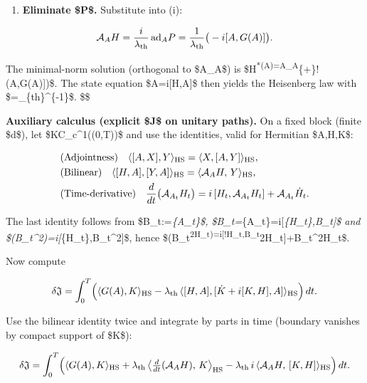 \documentclass[
]{article}
\providecommand{\tightlist}{%
  \setlength{\itemsep}{0pt}\setlength{\parskip}{0pt}}
\numberwithin{equation}{section}
\begin{document}
\begin{enumerate}
\def\labelenumi{(\roman{enumi})}
\setcounter{enumi}{2}
\tightlist
\item
  \textbf{Eliminate \$P\$.} Substitute into (i):
\end{enumerate}

\[
\mathcal A_A H=\frac{i}{\lambda_{\rm th}}\,\mathrm{ad}_A P
=\frac{1}{\lambda_{\rm th}}\big(-i[A,G(A)]\big).
\]

The minimal-norm solution (orthogonal to \$\ker\mathcal A\_A\$) is
\$H\textsuperscript{*(A)=\mathcal A\_A}\{+\}!\big(\tfrac{-,i}{\lambda\_{\rm th}}{[}A,G(A){]}\big)\$.
The state equation \$\dot A=i{[}H,A{]}\$ then yields the Heisenberg law
with \$\hbar=\lambda\_\{\rm th\}\^{}\{-1\}\$. \$\square\$

\textbf{Auxiliary calculus (explicit \$\delta\mathfrak J\$ on unitary
paths).} On a fixed block (finite \$d\$), let \$K\in C\_c\^{}1((0,T))\$
and use the identities, valid for Hermitian \$A,H,K\$:

\[
\begin{aligned}
&\text{(Adjointness)}\quad \langle[A,X],Y\rangle_{\rm HS}=\langle X,[A,Y]\rangle_{\rm HS},\\
&\text{(Bilinear)}\quad \langle[H,A],[Y,A]\rangle_{\rm HS}=\langle \mathcal A_A H,\,Y\rangle_{\rm HS},\\
&\text{(Time-derivative)}\quad \frac{d}{dt}\big(\mathcal A_{A_t}H_t\big)=i\,[H_t,\mathcal A_{A_t}H_t]+\mathcal A_{A_t}\dot H_t.
\end{aligned}
\]

The last identity follows from \$B\_t:=\emph{\{A\_t\}\$,
\$\dot B\_t=}\{\dot A\_t\}=i{[}\emph{\{H\_t\},B\_t{]}\$
and \$\dot(B\_t\^{}2)=i{[}}\{H\_t\},B\_t\^{}2{]}\$, hence
\$(B\_t\textsuperscript{2H\_t)=i{[}!H\_t,B\_t}2H\_t{]}+B\_t\^{}2\dot H\_t\$.

Now compute

\[
\delta\mathfrak J=\int_0^T\!\Big(\langle G(A),K\rangle_{\rm HS}-\lambda_{\rm th}\,\langle[H,A],[\dot K+i[K,H],A]\rangle_{\rm HS}\Big)\,dt.
\]

Use the bilinear identity twice and integrate by parts in time (boundary
vanishes by compact support of \$K\$):

\[
\delta\mathfrak J
=\int_0^T\!\Big(\langle G(A),K\rangle_{\rm HS}
+\lambda_{\rm th}\,\big\langle\tfrac{d}{dt}(\mathcal A_A H),\,K\big\rangle_{\rm HS}
-\lambda_{\rm th}\,i\,\langle \mathcal A_A H,\,[K,H]\rangle_{\rm HS}\Big)\,dt.
\]
\end{document}
